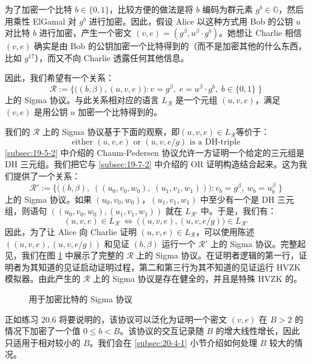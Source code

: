 \begin{example}[加密后的比特]\label{exmp:20-3}
为了加密一个比特 $b\in\{0,1\}$，比较方便的做法是将 $b$ 编码为群元素 $g^b\in\mathbb{G}$，然后用乘性 ElGamal 对 $g^b$ 进行加密。因此，假设 Alice 以这种方式用 Bob 的公钥 $u$ 对比特 $b$ 进行加密，产生一个密文 $(v,e)=(g^\beta,u^\beta\cdot{g^b})$。她想让 Charlie 相信 $(v,e)$ 确实是由 Bob 的公钥加密一个比特得到的（而不是加密其他的什么东西，比如 $g^{17}$），而又不向 Charlie 透露任何其他信息。

因此，我们希望有一个关系：
$$
\mathcal{R}:=
\bigg\lbrace
\Big(
(b,\beta),(u,v,e)
\Big):
v=g^\beta,\;
e=u^\beta\cdot g^b,\;
b\in\{0,1\}\;
\bigg\rbrace
$$
上的 Sigma 协议。与此关系相对应的语言 $L_{\mathcal R}$ 是一个元组 $(u,v,e)$，满足 $(v,e)$ 是用公钥 $u$ 加密一个比特得到的。

我们的 $\mathcal{R}$ 上的 Sigma 协议基于下面的观察，即$(u,v,e)\in L_{\mathcal R}$等价于：
$$
\text{either }
(u,v,e)
\text{ or }
(u,v,{e}/{g})
\text{ is a DH-triple}
$$
\ref{subsec:19-5-2} 中介绍的 Chaum-Pedersen 协议允许一方证明一个给定的三元组是 DH 三元组。我们把它与 \ref{subsec:19-7-2} 中介绍的 OR 证明构造结合起来。这为我们提供了一个关系：
$$
\mathcal{R}':=
\bigg\lbrace
\Big(
(b,\beta),\;((u_0,v_0,w_0),\;(u_1,v_1,w_1))
\Big):
v_b=g^\beta,~
w_b=u_b^\beta\;
\bigg\rbrace
$$
上的 Sigma 协议。如果 $(u_0,v_0,w_0)$，$(u_1,v_1,w_1)$ 中至少有一个是 DH 三元组，则语句 $((u_0,v_0,w_0),(u_1,v_1,w_1))$ 就在 $L_{\mathcal{R}'}$ 中。于是，我们有：
$$
(u,v,e)\in L_{\mathcal R}\ \iff\ 
\Big((u,v,e),(u,v,{e}/{g})\Big)\in L_{\mathcal R'}
$$
因此，为了让 Alice 向 Charlie 证明 $(u,v,e)\in L_{\mathcal{R}}$，可以使用陈述 $((u,v,e),(u,v,{e}/{g}))$ 和见证 $(b,\beta)$ 运行一个 $\mathcal{R}'$ 上的 Sigma 协议。完整起见，我们在图 \ref{fig:20-1} 中展示了完整的 $\mathcal R$ 上的 Sigma 协议。在证明者逻辑的第一行，证明者为其知道的见证启动证明过程，第二和第三行为其不知道的见证运行 HVZK 模拟器。由此产生的 $\mathcal R$ 上的 Sigma 协议是存在健全的，并且是特殊 HVZK 的。

\begin{figure}
  \centering
  
  \caption{用于加密比特的 Sigma 协议}
  \label{fig:20-1}
\end{figure}

正如练习 20.6 将要说明的，该协议可以泛化为证明一个密文 $(v,e)$ 在 $B>2$ 的情况下加密了一个值 $0\leq b < B$。该协议的交互记录随 $B$ 的增大线性增长，因此只适用于相对较小的 $B$。我们会在 \ref{subsec:20-4-1} 小节介绍如何处理 $B$ 较大的情况。
\end{example}

